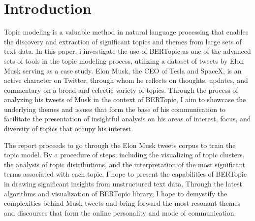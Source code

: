 \documentclass[12pt]{article}
\begin{document}
\section{Introduction}
Topic modeling is a valuable method in natural language processing that enables the discovery and extraction of significant topics and themes from large sets of text data. In this paper, i investigate the use of BERTopic as one of the advanced sets of tools in the topic modeling process, utilizing a dataset of tweets by Elon Musk serving as a case study. Elon Musk, the CEO of Tesla and SpaceX, is an active character on Twitter, through whom he reflects on thoughts, updates, and commentary on a broad and eclectic variety of topics. Through the process of analyzing his tweets of Musk in the context of BERTopic, I aim to showcase the underlying themes and issues that form the base of his communication to facilitate the presentation of insightful analysis on his areas of interest, focus, and diversity of topics that occupy his interest.

The report  proceeds to go through the Elon Musk tweets corpus to train the topic model. By a procedure of steps, including the visualizing of topic clusters, the analysis of topic distributions, and the interpretation of the most significant terms associated with each topic, I hope to present the capabilities of BERTopic in drawing significant insights from unstructured text data. Through the latest algorithms and visualization  of BERTopic library, I hope to demystify the complexities behind Musk tweets and bring forward the most resonant themes and discourses that form the online personality and mode of communication.
\end{document}
